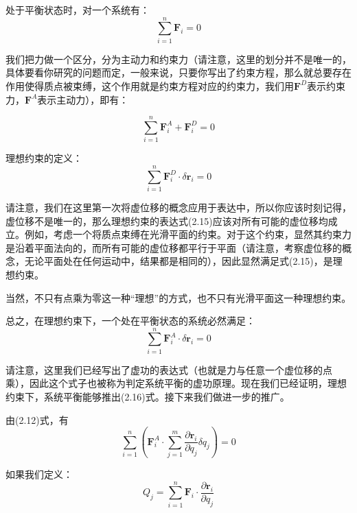 \documentclass[a4paper, 10pt, openany]{book}%
\begin{document}
   处于平衡状态时，对一个系统有：
   \begin{equation}
   \sum_{i=1}^n \textbf{F}_i=0
   \end{equation}

   我们把力做一个区分，分为主动力和约束力（请注意，这里的划分并不是唯一的，具体要看你研究的问题而定，一般来说，只要你写出了约束方程，那么就总要存在作用使得质点被束缚，这个作用就是约束方程对应的约束力，我们用$\textbf{F}^D$表示约束力，$\textbf{F}^A$表示主动力），即有：
  
   \begin{equation}
    \sum_{i=1}^n \textbf{F}^A_i+\textbf{F}^D_i=0
    \end{equation}

   理想约束的定义：
   \begin{equation}
    \sum_{i=1}^n \textbf{F}^D_i\cdot\delta \textbf{r}_i=0
   \end{equation}

请注意，我们在这里第一次将虚位移的概念应用于表达中，所以你应该时刻记得，虚位移不是唯一的，那么理想约束的表达式(2.15)应该对所有可能的虚位移均成立。例如，考虑一个将质点束缚在光滑平面的约束。对于这个约束，显然其约束力是沿着平面法向的，而所有可能的虚位移都平行于平面（请注意，考察虚位移的概念，无论平面处在任何运动中，结果都是相同的），因此显然满足式(2.15)，是理想约束。

当然，不只有点乘为零这一种“理想”的方式，也不只有光滑平面这一种理想约束。




   总之，在理想约束下，一个处在平衡状态的系统必然满足：
   \begin{equation}
    \sum_{i=1}^n \textbf{F}^A_i\cdot\delta \textbf{r}_i=0
   \end{equation}
   
   请注意，这里我们已经写出了虚功的表达式（也就是力与任意一个虚位移的点乘），因此这个式子也被称为判定系统平衡的虚功原理。现在我们已经证明，理想约束下，系统平衡能够推出(2.16)式。接下来我们做进一步的推广。


   由(2.12)式，有
   \begin{equation}
    \sum_{i=1}^n(\textbf{F}^A_i \cdot \sum_{j=1}^m \frac{\partial \textbf{r}_i}{\partial q_j}\delta q_j)=0
   \end{equation}
  
   如果我们定义：
   \begin{equation}
   Q_j=\sum_{i=1}^n \textbf{F}_i \cdot \frac{\partial \textbf{r}_i}{\partial q_j}
   \end{equation}
\end{document}

